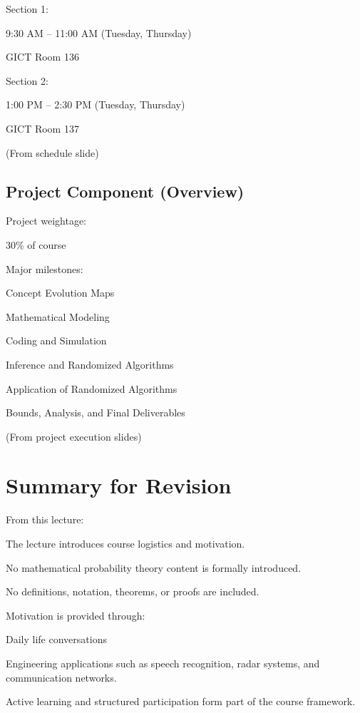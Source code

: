 \documentclass[12pt]{article}
\begin{document}
Section 1:

9:30 AM – 11:00 AM (Tuesday, Thursday)

GICT Room 136

Section 2:

1:00 PM – 2:30 PM (Tuesday, Thursday)

GICT Room 137

(From schedule slide) 


\subsection{Project Component (Overview)}

Project weightage:

30\% of course

Major milestones:

Concept Evolution Maps

Mathematical Modeling

Coding and Simulation

Inference and Randomized Algorithms

Application of Randomized Algorithms

Bounds, Analysis, and Final Deliverables

(From project execution slides) 


\section{Summary for Revision}

From this lecture:

The lecture introduces course logistics and motivation.

No mathematical probability theory content is formally introduced.

No definitions, notation, theorems, or proofs are included.

Motivation is provided through:

Daily life conversations

Engineering applications such as speech recognition, radar systems, and communication networks.

Active learning and structured participation form part of the course framework.
\end{document}
